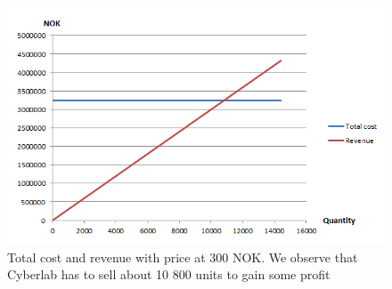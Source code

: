 \begin{figure}
\begin{center}
\includegraphics[scale=0.7]{fixedlowprice}
\caption[Price related to commercial video games]{Total cost and revenue with price at 300 NOK. We observe that Cyberlab has to sell about 10 800 units to gain some profit}
\label{fig:FixedLowPrice}
\end{center}
\end{figure}


